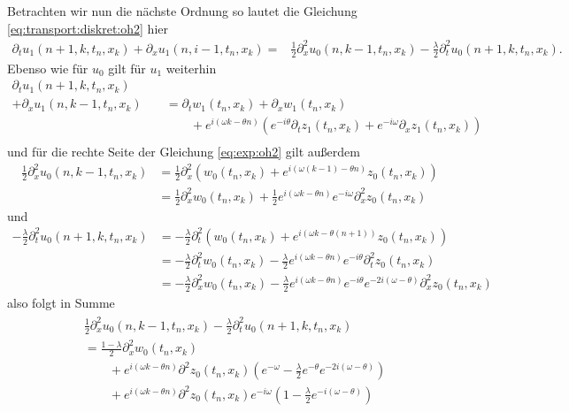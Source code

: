 Betrachten wir nun die nächste Ordnung so lautet die Gleichung \eqref{eq:transport:diskret:oh2} hier
\begin{align}\label{eq:exp:oh2}
\partial_t u_1(n+1, k, t_n, x_k)+ \partial_x u_1(n, i-1, t_n, x_k) =
&\frac {1}{2} \partial^2_x u_0(n, k-1, t_n, x_k) - \frac{\lambda}{2} \partial^2_t u_0(n+1, k, t_n, x_k).
\end{align}
Ebenso wie für $u_0$ gilt für $u_1$ weiterhin
\begin{align*}
\partial_t u_1(n+1, k, t_n, x_k) \qquad\\
+ \partial_x u_1(n, k-1, t_n, x_k)
&= \partial_t w_1(t_n, x_k) + \partial_x w_1(t_n, x_k) \\
&\qquad + e^{i (\omega k - \theta n)}  \left( e^{- i \theta} \partial_t z_1(t_n, x_k) + e^{-i \omega} \partial_x z_1(t_n, x_k) \right)\\
\end{align*}
und für die rechte Seite der Gleichung \eqref{eq:exp:oh2} gilt außerdem
\begin{align*}
\frac {1}{2} \partial^2_x u_0(n, k-1, t_n, x_k)
&= \frac {1}{2} \partial^2_x \left( w_0(t_n, x_k) + e^{i(\omega (k-1) - \theta n)} z_0(t_n, x_k) \right) \\
&= \frac{1}{2} \partial^2_x w_0(t_n, x_k) + \frac{1}{2} e^{i(\omega k - \theta n)} e^{- i\omega} \partial^2_x z_0(t_n, x_k)
\end{align*}
und
\begin{align*}
-\frac {\lambda}{2} \partial^2_t u_0(n+1, k, t_n, x_k)
&= -\frac {\lambda}{2} \partial^2_t \left( w_0(t_n, x_k) + e^{i(\omega k - \theta (n+1))} z_0(t_n, x_k) \right) \\
&= -\frac{\lambda}{2} \partial^2_t w_0(t_n, x_k) - \frac{\lambda}{2} e^{i(\omega k - \theta n)} e^{- i\theta} \partial^2_t z_0(t_n, x_k)\\
&= -\frac{\lambda}{2} \partial^2_x w_0(t_n, x_k) - \frac{\lambda}{2} e^{i(\omega k - \theta n)} e^{- i\theta} e^{- 2i (\omega - \theta)} \partial^2_x z_0(t_n, x_k)
\end{align*}
also folgt in Summe
\begin{align}
\begin{split}
&\frac {1}{2} \partial^2_x u_0(n, k-1, t_n, x_k) -\frac {\lambda}{2} \partial^2_t u_0(n+1, k, t_n, x_k)\\
&= \frac {1-\lambda}{2} \partial^2_x w_0(t_n, x_k)\\
&\qquad + e^{i(\omega k - \theta n)} \partial^2 z_0(t_n, x_k) \left( e^{- \omega} - \frac{\lambda}{2} e^{- \theta} e^{-2 i(\omega - \theta)} \right)\\
&\qquad + e^{i(\omega k - \theta n)} \partial^2 z_0(t_n, x_k) e^{- i\omega} \left( 1 - \frac{\lambda}{2} e^{-i(\omega - \theta)} \right)
\end{split}
\end{align}
